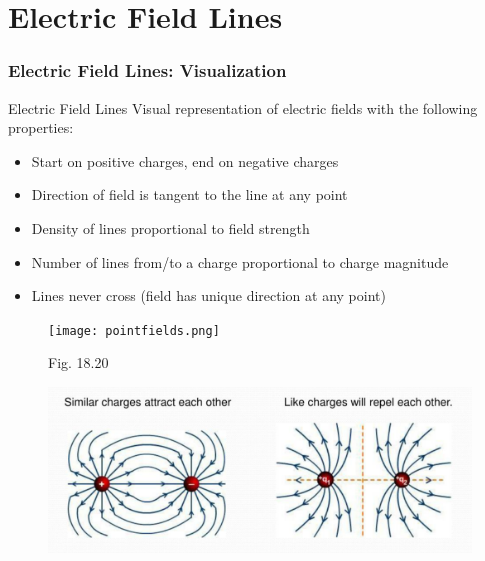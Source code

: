 \documentclass{beamer}
\newcommand{\highlight}[1]{\textcolor{ds9red}{#1}}
\begin{document}
\section{Electric Field Lines}

\begin{frame}
    \frametitle{Electric Field Lines: Visualization}
    
    \begin{block}{Electric Field Lines}
        Visual representation of electric fields with the following properties:
    \end{block}
    
    \begin{itemize}
        \item Start on \highlight{positive} charges, end on \highlight{negative} charges
        \item Direction of field is \highlight{tangent} to the line at any point
        \item Density of lines proportional to field \highlight{strength}
        \item Number of lines from/to a charge proportional to charge \highlight{magnitude}
        \item Lines \highlight{never cross} (field has unique direction at any point)
    \end{itemize}
    
    \begin{figure}
        \centering
        \texttt{[image: pointfields.png]}
        \caption{Fig. 18.20}
    \end{figure}
\end{frame}

\begin{frame}
\begin{figure}
            \centering
\includegraphics[width=1\linewidth]{repellines.png}
            \vspace{0.5cm}
          
        \end{figure}
\end{frame}
\end{document}
